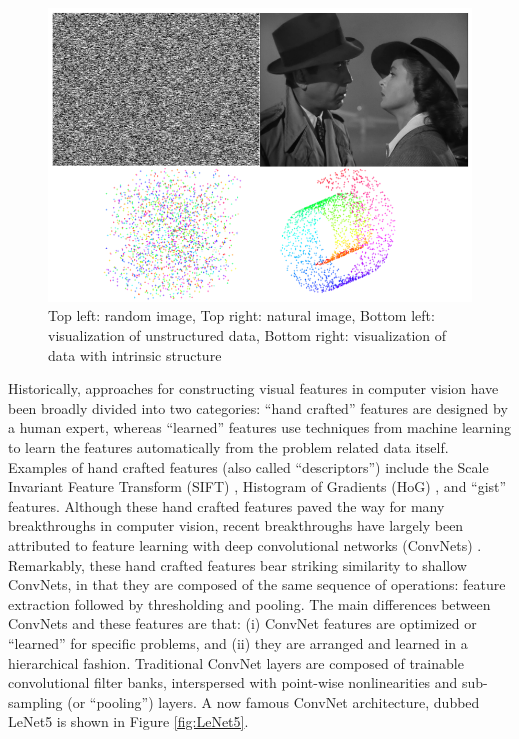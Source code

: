 \begin{figure} 
\centering
\includegraphics[scale=0.3]{./figures/introduction/structure.png} 
\caption{Top left: random image, Top right: natural image, Bottom left: visualization of
unstructured data, Bottom right: visualization of data with intrinsic
structure} 
\label{fig:structure} 
\end{figure}  

Historically, approaches for constructing visual features in computer vision
have been broadly divided into two categories: ``hand crafted'' features are
designed by a human expert, whereas ``learned'' features use techniques from
machine learning to learn the features automatically from the problem related
data itself. Examples of hand crafted features (also called ``descriptors'')
include the Scale Invariant Feature Transform (SIFT) \cite{SIFT}, Histogram of
Gradients (HoG) \cite{HoG}, and ``gist'' \cite{gist} features. Although these
hand crafted features paved the way for many breakthroughs in computer vision,
recent breakthroughs have largely been attributed to feature learning with deep
convolutional networks (ConvNets) \cite{fukushima1980, LeCun1998, ImageNet}.
Remarkably, these hand crafted features bear striking similarity to shallow
ConvNets, in that they are composed of the same sequence of operations: feature
extraction followed by thresholding and pooling. The main differences between
ConvNets and these features are that: (i) ConvNet features are optimized or
``learned'' for specific problems, and (ii) they are arranged and learned in a
hierarchical fashion. Traditional ConvNet layers are composed of trainable
convolutional filter banks, interspersed with point-wise nonlinearities and
sub-sampling (or ``pooling'') layers.  A now famous ConvNet architecture,
dubbed LeNet5 \cite{LeCun1998} is shown in Figure \ref{fig:LeNet5}.       

